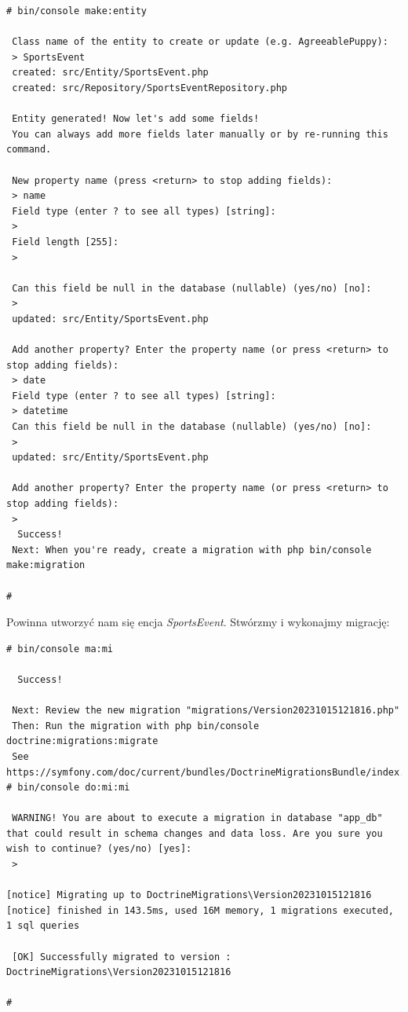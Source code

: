 \documentclass[polish, a4paper]{article}
\begin{document}
\begin{verbatim}
# bin/console make:entity

 Class name of the entity to create or update (e.g. AgreeablePuppy):
 > SportsEvent
 created: src/Entity/SportsEvent.php
 created: src/Repository/SportsEventRepository.php

 Entity generated! Now let's add some fields!
 You can always add more fields later manually or by re-running this command.

 New property name (press <return> to stop adding fields):
 > name
 Field type (enter ? to see all types) [string]:
 >
 Field length [255]:
 >

 Can this field be null in the database (nullable) (yes/no) [no]:
 >
 updated: src/Entity/SportsEvent.php

 Add another property? Enter the property name (or press <return> to stop adding fields):
 > date
 Field type (enter ? to see all types) [string]:
 > datetime
 Can this field be null in the database (nullable) (yes/no) [no]:
 >
 updated: src/Entity/SportsEvent.php

 Add another property? Enter the property name (or press <return> to stop adding fields):
 >
  Success!
 Next: When you're ready, create a migration with php bin/console make:migration

#
\end{verbatim}

Powinna utworzyć nam się encja \emph{SportsEvent}. Stwórzmy i wykonajmy migrację:

\begin{verbatim}
# bin/console ma:mi

  Success!

 Next: Review the new migration "migrations/Version20231015121816.php"
 Then: Run the migration with php bin/console doctrine:migrations:migrate
 See https://symfony.com/doc/current/bundles/DoctrineMigrationsBundle/index.html
# bin/console do:mi:mi

 WARNING! You are about to execute a migration in database "app_db" that could result in schema changes and data loss. Are you sure you wish to continue? (yes/no) [yes]:
 >

[notice] Migrating up to DoctrineMigrations\Version20231015121816
[notice] finished in 143.5ms, used 16M memory, 1 migrations executed, 1 sql queries

 [OK] Successfully migrated to version : DoctrineMigrations\Version20231015121816

#
\end{verbatim}
\end{document}
